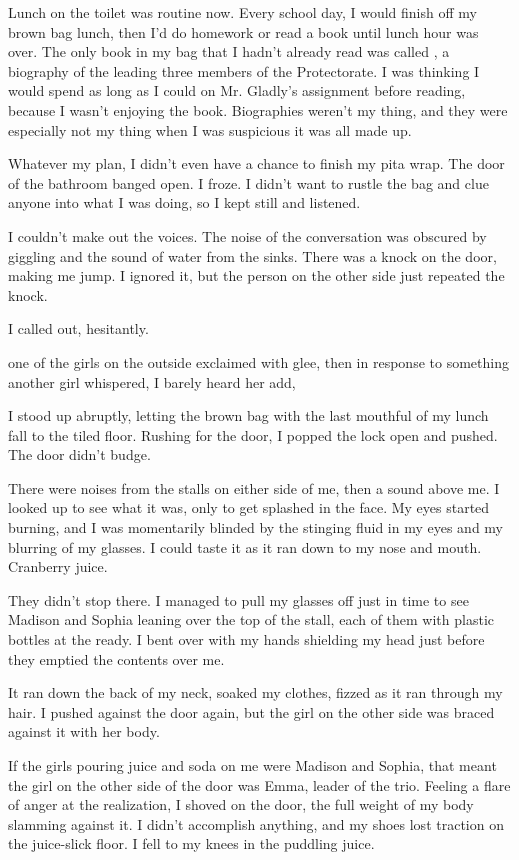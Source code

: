 Lunch on the toilet was routine now. Every school day, I would finish off my brown bag lunch, then I'd do homework or read a book until lunch hour was over. The only book in my bag that I hadn't already read was called , a biography of the leading three members of the Protectorate. I was thinking I would spend as long as I could on Mr. Gladly's assignment before reading, because I wasn't enjoying the book. Biographies weren't my thing, and they were especially not my thing when I was suspicious it was all made up.

Whatever my plan, I didn't even have a chance to finish my pita wrap. The door of the bathroom banged open. I froze. I didn't want to rustle the bag and clue anyone into what I was doing, so I kept still and listened.

I couldn't make out the voices. The noise of the conversation was obscured by giggling and the sound of water from the sinks. There was a knock on the door, making me jump. I ignored it, but the person on the other side just repeated the knock.

 I called out, hesitantly.

 one of the girls on the outside exclaimed with glee, then in response to something another girl whispered, I barely heard her add, 

I stood up abruptly, letting the brown bag with the last mouthful of my lunch fall to the tiled floor. Rushing for the door, I popped the lock open and pushed. The door didn't budge.

There were noises from the stalls on either side of me, then a sound above me. I looked up to see what it was, only to get splashed in the face. My eyes started burning, and I was momentarily blinded by the stinging fluid in my eyes and my blurring of my glasses. I could taste it as it ran down to my nose and mouth. Cranberry juice.

They didn't stop there. I managed to pull my glasses off just in time to see Madison and Sophia leaning over the top of the stall, each of them with plastic bottles at the ready. I bent over with my hands shielding my head just before they emptied the contents over me.

It ran down the back of my neck, soaked my clothes, fizzed as it ran through my hair. I pushed against the door again, but the girl on the other side was braced against it with her body.

If the girls pouring juice and soda on me were Madison and Sophia, that meant the girl on the other side of the door was Emma, leader of the trio. Feeling a flare of anger at the realization, I shoved on the door, the full weight of my body slamming against it. I didn't accomplish anything, and my shoes lost traction on the juice-slick floor. I fell to my knees in the puddling juice.

